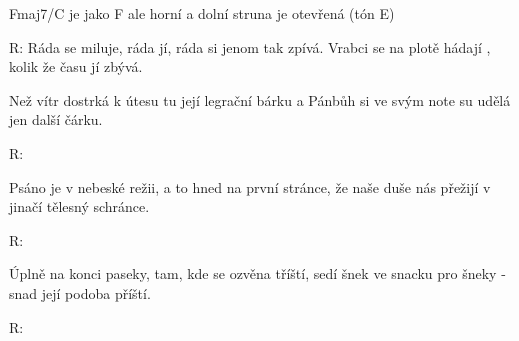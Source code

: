 \resetVars
{}
\MakeHeader
\Lyrics

Fmaj7/C je jako F ale horní a dolní struna je otevřená (tón E)

R: Ráda se miluje, ráda jí,
ráda si jenom tak  zpívá.
Vrabci se na plotě hádají ,
kolik že času jí zbývá.

Než vítr dostrká k útesu tu její legrační bárku
a Pánbůh si ve svým note su
udělá jen další čárku.

R:

Psáno je v nebeské režii, a to hned na první stránce,
že naše duše nás přežijí v jinačí tělesný schránce.

R:

Úplně na konci paseky, tam, kde se ozvěna tříští,
sedí šnek ve snacku pro šneky - snad její podoba příští.

R:

\Next
